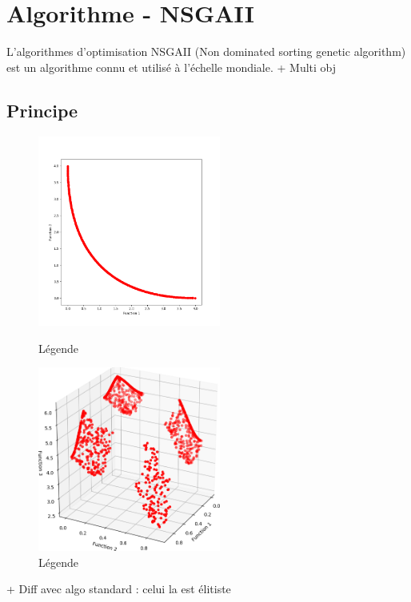\documentclass[12pt]{report}
\begin{document}
    \section{Algorithme - NSGAII}
    L'algorithmes d'optimisation NSGAII (Non dominated sorting genetic algorithm) est un algorithme connu et utilisé à l'échelle mondiale.
    + Multi obj
      \subsection{Principe}
      \begin{figure}[h]
        \begin{minipage}[c]{.46\linewidth}
            \centering
            \includegraphics[width=6cm]{img/4,1,1_Pareto_uni.png}
            \caption{Légende}
        \end{minipage}
        \hfill%
        \begin{minipage}[c]{.46\linewidth}
            \centering
            \includegraphics[width=6cm]{img/4,1,1_Pareto.png}
            \caption{Légende}
        \end{minipage}
      \end{figure}


      + Diff avec algo standard : celui la est élitiste
\end{document}

